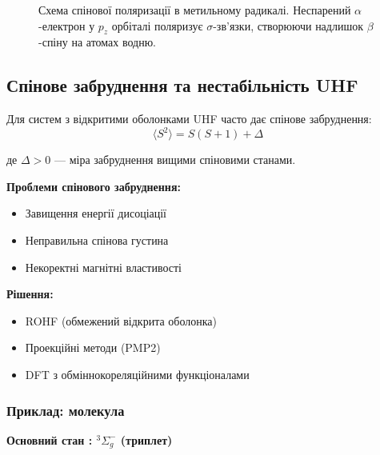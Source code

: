 \begin{figure}[h!]\centering
\caption{Схема спінової поляризації в метильному радикалі.
Неспарений $\alpha$-електрон у $p_z$ орбіталі поляризує $\sigma$-зв'язки,
створюючи надлишок $\beta$-спіну на атомах водню.}
\label{pic:spin_polarization}
\end{figure}

\subsection{Спінове забруднення та нестабільність UHF}

Для систем з відкритими оболонками UHF часто дає спінове забруднення:
\[
\langle S^2 \rangle = S(S+1) + \Delta
\]

де $\Delta > 0$ --- міра забруднення вищими спіновими станами.

\textbf{Проблеми спінового забруднення:}
\begin{itemize}
    \item Завищення енергії дисоціації
    \item Неправильна спінова густина
    \item Некоректні магнітні властивості
\end{itemize}

\textbf{Рішення:}
\begin{itemize}
    \item ROHF (обмежений відкрита оболонка)
    \item Проекційні методи (PMP2)
    \item DFT з обміннокореляційними функціоналами
\end{itemize}

\subsubsection{Приклад: молекула }


\textbf{Основний стан : $^3\Sigma_g^-$ (триплет)}

